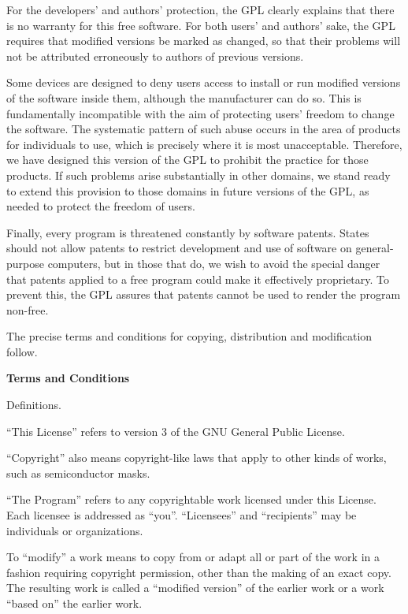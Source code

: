 For the developers' and authors' protection, the GPL clearly explains that there is no warranty for this free software.  For both users' and authors' sake, the GPL requires that modified versions be marked as changed, so that their problems will not be attributed erroneously to authors of previous versions.

Some devices are designed to deny users access to install or run modified versions of the software inside them, although the manufacturer can do so.  This is fundamentally incompatible with the aim of protecting users' freedom to change the software.  The systematic pattern of such abuse occurs in the area of products for individuals to use, which is precisely where it is most unacceptable.  Therefore, we have designed this version of the GPL to prohibit the practice for those products.  If such problems arise substantially in other domains, we stand ready to extend this provision to those domains in future versions of the GPL, as needed to protect the freedom of users.

Finally, every program is threatened constantly by software patents. States should not allow patents to restrict development and use of software on general-purpose computers, but in those that do, we wish to avoid the special danger that patents applied to a free program could make it effectively proprietary.  To prevent this, the GPL assures that patents cannot be used to render the program non-free.

The precise terms and conditions for copying, distribution and modification follow.

{\bf Terms and Conditions}

\startitemize[n][start=0]

\item Definitions.

``This License'' refers to version 3 of the GNU General Public License.

``Copyright'' also means copyright-like laws that apply to other kinds of works, such as semiconductor masks.

``The Program'' refers to any copyrightable work licensed under this License.  Each licensee is addressed as ``you''.  ``Licensees'' and ``recipients'' may be individuals or organizations.

To ``modify'' a work means to copy from or adapt all or part of the work in a fashion requiring copyright permission, other than the making of an exact copy.  The resulting work is called a ``modified version'' of the earlier work or a work ``based on'' the earlier work.

